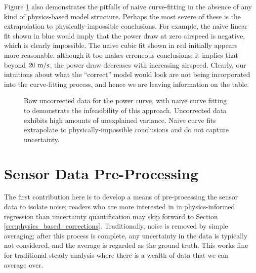 Figure \ref{fig:power_curve_naive} also demonstrates the pitfalls of naive curve-fitting in the absence of any kind of physics-based model structure. Perhaps the most severe of these is the extrapolation to physically-impossible conclusions. For example, the naive linear fit shown in blue would imply that the power draw at zero airspeed is negative, which is clearly impossible. The naive cubic fit shown in red initially appears more reasonable, although it too makes erroneous conclusions: it implies that beyond $20\ \rm m/s$, the power draw decreases with increasing airspeed. Clearly, our intuitions about what the ``correct'' model would look are not being incorporated into the curve-fitting process, and hence we are leaving information on the table.

\begin{figure}[h]
    \centering
    \caption{Raw uncorrected data for the power curve, with naive curve fitting to demonstrate the infeasibility of this approach. Uncorrected data exhibits high amounts of unexplained variance. Naive curve fits extrapolate to physically-impossible conclusions and do not capture uncertainty.}
    \label{fig:power_curve_naive}
\end{figure}


\section{Sensor Data Pre-Processing}

The first contribution here is to develop a means of pre-processing the sensor data to isolate noise; readers who are more interested in in physics-informed regression than uncertainty quantification may skip forward to Section \ref{sec:physics_based_corrections}. Traditionally, noise is removed by simple averaging; after this process is complete, any uncertainty in the data is typically not considered, and the average is regarded as the ground truth. This works fine for traditional steady analysis where there is a wealth of data that we can average over.


